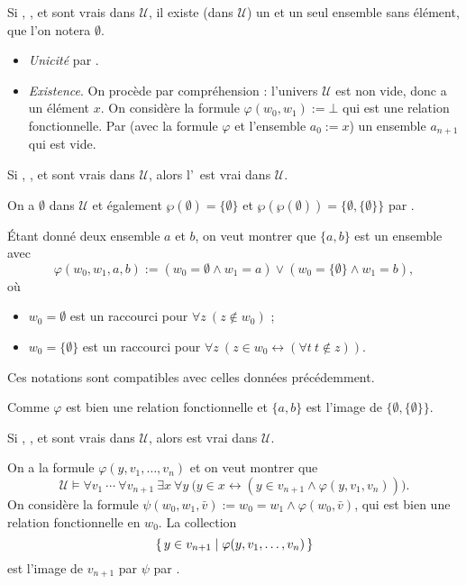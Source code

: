 \documentclass[./main]{subfiles}
\begin{document}
  \begin{thm}
    Si , ,  et  sont vrais dans  $\mathcal{U}$, il existe (dans $\mathcal{U}$) un et un seul ensemble sans élément, que l'on notera $\emptyset$.
  \end{thm}
  \begin{prv}
    \begin{itemize}
      \item \textit{Unicité} par .
      \item  \textit{Existence}.
        On procède par compréhension : l'univers $\mathcal{U}$ est non vide, donc a un élément $x$.
        On considère la formule $\varphi(w_0, w_1) := \bot$ qui est une relation fonctionnelle.
        Par  (avec la formule $\varphi$ et l'ensemble  $a_0 := x$) un ensemble $a_{n+1}$ qui est vide.
    \end{itemize}
  \end{prv}

  \begin{prop}
    Si , ,  et  sont vrais dans  $\mathcal{U}$, alors l'\pairaxiom\ est vrai dans $\mathcal{U}$.
  \end{prop}
  \begin{prv}
    On a $\emptyset$ dans $\mathcal{U}$ et également $\wp(\emptyset) = \{\emptyset\}$ et $\wp(\wp(\emptyset)) = \{\emptyset, \{\emptyset\}\}$ par .

    Étant donné deux ensemble $a$ et $b$, on veut montrer que $\{a,b\}$ est un ensemble avec  \[
    \varphi(w_0, w_1, a, b) := (w_0 = \emptyset \land w_1 = a) \lor (w_0 = \{\emptyset\} \land w_1 = b)
    ,\]
    où 
    \begin{itemize}
      \item $w_0 = \emptyset$ est un raccourci pour $\forall z \: (z \not\in w_0)$ ;
      \item $w_0 = \{\emptyset\} $ est un raccourci pour $\forall z \: (z \in w_0 \leftrightarrow (\forall t \: t \not\in z))$.
    \end{itemize}
    Ces notations sont compatibles avec celles données précédemment.

    Comme  $\varphi$ est bien une relation fonctionnelle et $\{a,b\}$  est l'image de $ \{\emptyset, \{\emptyset\}\}$.
  \end{prv}

  \begin{prop}
    Si , ,  et  sont vrais dans  $\mathcal{U}$, alors  est vrai dans $\mathcal{U}$.
  \end{prop}
  \begin{prv}
    On a la formule $\varphi(y, v_1, \ldots, v_n)$ et on veut montrer que 
    \[
    \mathcal{U} \models \forall v_1 \: \cdots \: \forall v_{n+1} \: \exists x \: \forall y \: \big(
      y \in x \leftrightarrow (y \in v_{n+1} \land \varphi(y, v_1, v_n))
    \big)
    .\]
    On considère la formule $\psi(w_0, w_1, \bar{v}) := w_0 = w_1 \land \varphi(w_0, \bar{v})$, qui est bien une relation fonctionnelle en $w_0$.
    La collection \[
    \mleft\{\,y \in v_{n+1} \;\middle|\; \varphi(y, v_1, \ldots, v_n)\,\mright\}
    \] est l'image de $v_{n+1}$ par $\psi$ par .
  \end{prv}
\end{document}
